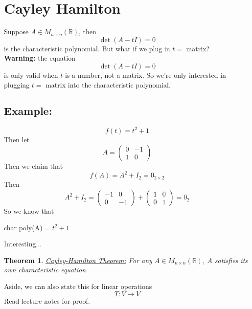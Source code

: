 \documentclass{article}
\newtheorem{theorem}{Theorem}[section]
\newtheorem{one minute paper}[theorem]{One Minute Paper}
\begin{document}
\section*{Cayley Hamilton}
Suppose $A \in M_{n\times n}(\mathbb{R})$, then 
\begin{equation}
    \det(A - tI) = 0
\end{equation}
is the characteristic polynomial. But what if we plug in $t = $ matrix? \\
\textbf{Warning:} the equation 
\begin{equation}
    \det(A - tI) = 0
\end{equation}
is only valid when $t$ is a number, not a matrix. So we're only interested in plugging $t= $ matrix into the 
characteristic polynomial. 
\subsection*{Example:}
\begin{equation}
    f(t) = t^2 + 1
\end{equation}
Then let 
\begin{equation}
    A = \begin{pmatrix}
        0 & -1 \\
        1 & 0
    \end{pmatrix}
\end{equation}
Then we claim that 
\begin{equation}
    f(A) = A^2 + I_2 = 0_{2\times 2}
\end{equation}
Then 
\begin{equation}
    A^2 + I_2 = \begin{pmatrix}
        -1 & 0 \\
        0 & -1 
    \end{pmatrix} + \begin{pmatrix}
        1 & 0 \\
        0 & 1
    \end{pmatrix} = 0_2
\end{equation}
So we know that
\begin{center}
    char poly(A) = $t^2 + 1$
\end{center}
Interesting...
\begin{theorem}
    \underline{Cayley-Hamilton Theorem:} For any $A \in M_{n \times n}(\mathbb{R})$, $A$ satisfies its own characteristic equation. 
\end{theorem}
Aside, we can also state this for linear operations 
\begin{equation}
    T: V \rightarrow V
\end{equation}
Read lecture notes for proof. 
\end{document}
